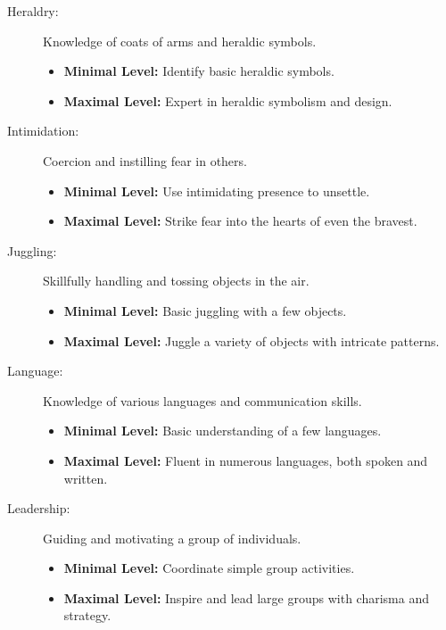 \documentclass[12pt]{book}
\begin{document}
\begin{description}
    \item[Heraldry:] Knowledge of coats of arms and heraldic symbols.
        \begin{itemize}
            \item \textbf{Minimal Level:} Identify basic heraldic symbols.
            \item \textbf{Maximal Level:} Expert in heraldic symbolism and design.
        \end{itemize}

    \item[Intimidation:] Coercion and instilling fear in others.
        \begin{itemize}
            \item \textbf{Minimal Level:} Use intimidating presence to unsettle.
            \item \textbf{Maximal Level:} Strike fear into the hearts of even the bravest.
        \end{itemize}

    \item[Juggling:] Skillfully handling and tossing objects in the air.
        \begin{itemize}
            \item \textbf{Minimal Level:} Basic juggling with a few objects.
            \item \textbf{Maximal Level:} Juggle a variety of objects with intricate patterns.
        \end{itemize}

    \item[Language:] Knowledge of various languages and communication skills.
        \begin{itemize}
            \item \textbf{Minimal Level:} Basic understanding of a few languages.
            \item \textbf{Maximal Level:} Fluent in numerous languages, both spoken and written.
        \end{itemize}

    \item[Leadership:] Guiding and motivating a group of individuals.
        \begin{itemize}
            \item \textbf{Minimal Level:} Coordinate simple group activities.
            \item \textbf{Maximal Level:} Inspire and lead large groups with charisma and strategy.
        \end{itemize}


\end{description}
\end{document}
